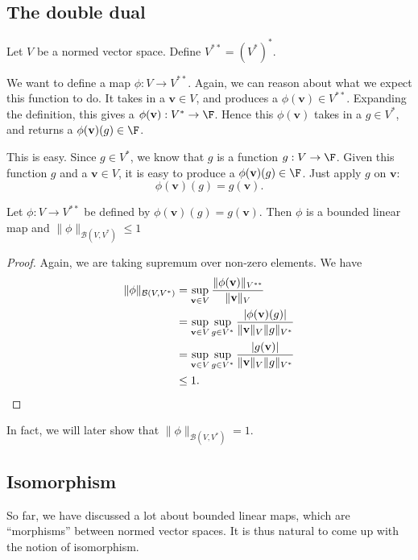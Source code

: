 \documentclass[a4paper]{article}
\begin{document}
\subsection{The double dual}
\begin{defi}
  Let $V$ be a normed vector space. Define $V^{**} = (V^*)^*$.
\end{defi}

We want to define a map $\phi: V\to V^{**}$. Again, we can reason about what we expect this function to do. It takes in a $\mathbf{v}\in V$, and produces a $\phi(\mathbf{v}) \in V^{**}$. Expanding the definition, this gives a $\phi(\mathbf{v}): V^* \to \F$. Hence this $\phi(\mathbf{v})$ takes in a $g\in V^*$, and returns a $\phi(\mathbf{v})(g)\in \F$.

This is easy. Since $g \in V^*$, we know that $g$ is a function $g: V\to \F$. Given this function $g$ and a $\mathbf{v}\in V$, it is easy to produce a $\phi(\mathbf{v})(g)\in \F$. Just apply $g$ on $\mathbf{v}$:
\[
  \phi(\mathbf{v})(g) = g(\mathbf{v}).
\]
\begin{prop}
  Let $\phi: V\to V^{**}$ be defined by $\phi(\mathbf{v})(g) = g(\mathbf{v})$. Then $\phi$ is a bounded linear map and $\|\phi\|_{\mathcal{B}(V, V^*)} \leq 1$
\end{prop}

\begin{proof}
  Again, we are taking supremum over non-zero elements. We have
  \begin{align*}
    \|\phi\|_{\mathcal{B}(V, V^*)} &= \sup_{\mathbf{v}\in V} \frac{\|\phi(\mathbf{v})\|_{V^{**}}}{\|\mathbf{v}\|_V}\\
    &= \sup_{\mathbf{v}\in V} \sup_{g\in V^*}\frac{|\phi(\mathbf{v})(g)|}{\|\mathbf{v}\|_V\|g\|_{V^*}}\\
    &= \sup_{\mathbf{v}\in V}\sup_{g\in V^*}\frac{|g(\mathbf{v})|}{\|\mathbf{v}\|_V\|g\|_{V^*}}\\
    &\leq 1.\qedhere
  \end{align*}
\end{proof}
In fact, we will later show that $\|\phi\|_{\mathcal{B}(V, V^*)} = 1$.

\subsection{Isomorphism}
So far, we have discussed a lot about bounded linear maps, which are ``morphisms'' between normed vector spaces. It is thus natural to come up with the notion of isomorphism.
\end{document}
